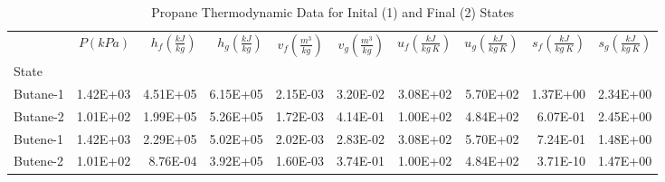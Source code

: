 \documentclass[10pt,parskip=half,
toc=sectionentrywithdots,
bibliography=totocnumbered,
captions=tableheading,numbers=noendperiod]{scrartcl}
\begin{document}
\begin{table}[H]
\caption{Propane Thermodynamic Data for Inital (1) and Final (2) States}\label{tbl:thermo}
\centering
\begin{adjustbox}{max width=\textwidth}
\begin{tabular}{lrrrrrrrrr}
\toprule
{} &  $P \left(kPa\right)$ &  $h_f \left(\frac{kJ}{kg}\right)$ &  $h_g \left(\frac{kJ}{kg}\right)$ &  $v_f \left(\frac{m^3}{kg}\right)$ &  $v_g \left(\frac{m^3}{kg}\right)$ &  $u_f \left(\frac{kJ}{kg\:K}\right)$ &  $u_g \left(\frac{kJ}{kg\:K}\right)$ &  $s_f \left(\frac{kJ}{kg\:K}\right)$ &  $s_g \left(\frac{kJ}{kg\:K}\right)$ \\
State    &                       &                                   &                                   &                                    &                                    &                                      &                                      &                                      &                                      \\
\midrule
Butane-1 &              1.42E+03 &                          4.51E+05 &                          6.15E+05 &                           2.15E-03 &                           3.20E-02 &                             3.08E+02 &                             5.70E+02 &                             1.37E+00 &                             2.34E+00 \\
Butane-2 &              1.01E+02 &                          1.99E+05 &                          5.26E+05 &                           1.72E-03 &                           4.14E-01 &                             1.00E+02 &                             4.84E+02 &                             6.07E-01 &                             2.45E+00 \\
Butene-1 &              1.42E+03 &                          2.29E+05 &                          5.02E+05 &                           2.02E-03 &                           2.83E-02 &                             3.08E+02 &                             5.70E+02 &                             7.24E-01 &                             1.48E+00 \\
Butene-2 &              1.01E+02 &                          8.76E-04 &                          3.92E+05 &                           1.60E-03 &                           3.74E-01 &                             1.00E+02 &                             4.84E+02 &                             3.71E-10 &                             1.47E+00 \\
\bottomrule
\end{tabular}

\end{adjustbox}
\end{table}
\end{document}
